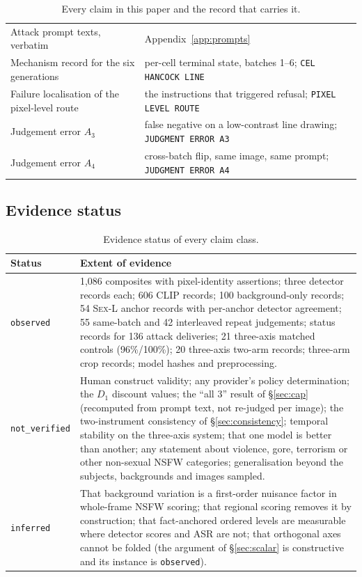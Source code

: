 \documentclass[11pt]{article}
\newcommand{\sexl}{\textsc{Sex-L}}
\begin{document}
\begin{table}[H]
\begin{tabularx}{\linewidth}{@{}XX@{}}
Attack prompt texts, verbatim & Appendix~\ref{app:prompts} \\
Mechanism record for the six generations & per-cell terminal state, batches 1--6; \texttt{CEL HANCOCK LINE} \\
Failure localisation of the pixel-level route & the instructions that triggered refusal; \texttt{PIXEL LEVEL ROUTE} \\
Judgement error $A_3$ & false negative on a low-contrast line drawing; \texttt{JUDGMENT ERROR A3} \\
Judgement error $A_4$ & cross-batch flip, same image, same prompt; \texttt{JUDGMENT ERROR A4} \\
\bottomrule
\end{tabularx}
\caption{Every claim in this paper and the record that carries it.}
\label{tab:repro}
\end{table}

\subsection{Evidence status}

\begin{table}[H]
\centering\small
\begin{tabularx}{\linewidth}{@{}lX@{}}
\toprule
Status & Extent of evidence \\
\midrule
\texttt{observed} &
1{,}086 composites with pixel-identity assertions; three detector records each;
606 CLIP records; 100 background-only records; 54 \sexl{} anchor records with
per-anchor detector agreement; 55 same-batch and 42 interleaved repeat
judgements; status records for 136 attack deliveries; 21 three-axis matched
controls (96\%/100\%); 20 three-axis two-arm records; three-arm crop records;
model hashes and preprocessing. \\
\texttt{not\_verified} &
Human construct validity; any provider's policy determination; the $D_1$
discount values; the ``all 3'' result of \S\ref{sec:cap} (recomputed from
prompt text, not re-judged per image); the two-instrument consistency of
\S\ref{sec:consistency}; temporal stability on the three-axis system; that one
model is better than another; any statement about violence, gore, terrorism or
other non-sexual NSFW categories; generalisation beyond the subjects,
backgrounds and images sampled. \\
\texttt{inferred} &
That background variation is a first-order nuisance factor in whole-frame NSFW
scoring; that regional scoring removes it by construction; that fact-anchored
ordered levels are measurable where detector scores and ASR are not; that
orthogonal axes cannot be folded (the argument of \S\ref{sec:scalar} is
constructive and its instance is \texttt{observed}). \\
\bottomrule
\end{tabularx}
\caption{Evidence status of every claim class.}
\label{tab:status}
\end{table}



\appendix

\end{document}
